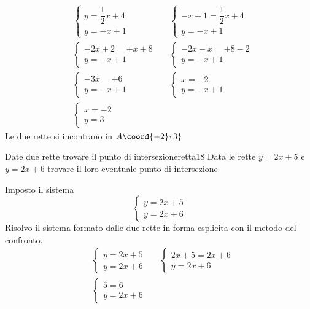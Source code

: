 \begin{align*}
	&\begin{cases} 
		y=\dfrac{1}{2}x+4\\
		y=-x+1
	\end{cases}&&\begin{cases} 
	-x+1=\dfrac{1}{2}x+4\\
	y=-x+1
\end{cases}\\
&\begin{cases} 
	-2x+2=+x+8\\
	y=-x+1
\end{cases}&&\begin{cases} 
-2x-x=+8-2\\
y=-x+1
\end{cases}\\
&\begin{cases} 
	-3x=+6\\
	y=-x+1
\end{cases}&&
\begin{cases} 
	x=-2\\
	y=-x+1
\end{cases}\\
&\begin{cases} 
	x=-2\\
	y=3
\end{cases}
\end{align*}
Le due rette si incontrano in $A\coord{-2}{3}$
\begin{cesempiot}{Date due rette trovare il punto di intersezione}{retta18}
	Data le rette $y=2x+5$ e $y=2x+6$ trovare il loro eventuale punto di intersezione
\end{cesempiot}
Imposto il sistema 
\[\begin{cases} 
y=2x+5\\
y=2x+6
\end{cases}\]
Risolvo il sistema formato dalle due rette in forma esplicita con il metodo del confronto.
\begin{align*}
	&\begin{cases} 
		y=2x+5\\
		y=2x+6
	\end{cases}&&\begin{cases} 
	2x+5=2x+6\\
	y=2x+6
\end{cases}\\
&\begin{cases} 
	5=6\\
	y=2x+6
\end{cases}
\end{align*}
